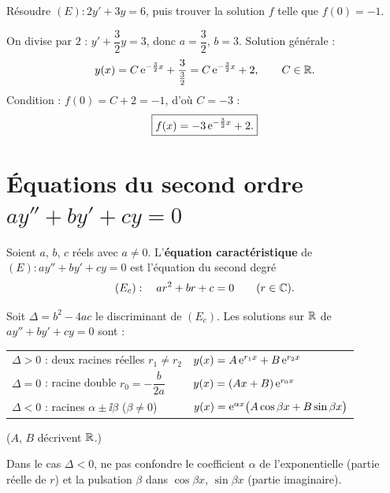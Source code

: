 \exerciceresolu
Résoudre $(E):2y'+3y=6$, puis trouver la solution $f$ telle que $f(0)=-1$.

\solution

On divise par $2$ : $y'+\dfrac32 y=3$, donc $a=\dfrac32$, $b=3$.
Solution générale :
\[
y(x)=C\,\mathrm{e}^{-\frac32 x}+\frac{3}{\frac32}=C\,\mathrm{e}^{-\frac32 x}+2,\qquad C\in\mathbb{R}.
\]
Condition : $f(0)=C+2=-1$, d'où $C=-3$ :
\[
\boxed{f(x)=-3\,\mathrm{e}^{-\frac32 x}+2.}
\]


\section{Équations du second ordre \texorpdfstring{$ay''+by'+cy=0$}{ay''+by'+cy=0}}

\begin{definition}
	Soient $a$, $b$, $c$ réels avec $a\neq 0$. L'\textbf{équation
	caractéristique} de $(E):ay''+by'+cy=0$ est l'équation du second degré
	\[
	(E_c):\quad a r^{2}+b r+c=0\qquad (r\in\mathbb{C}).
	\]
\end{definition}

\begin{theoreme}
	Soit $\Delta=b^{2}-4ac$ le discriminant de $(E_c)$. Les solutions sur $\mathbb{R}$
	de $ay''+by'+cy=0$ sont :
	\begin{center}
	\renewcommand{\arraystretch}{2.0}
	\begin{tabular}{>{\raggedright\arraybackslash}p{3.4cm}
	                >{\raggedright\arraybackslash}p{5.0cm}}
	\hline
	$\Delta>0$ : deux racines réelles $r_1\neq r_2$
	& $y(x)=A\,\mathrm{e}^{r_1 x}+B\,\mathrm{e}^{r_2 x}$ \\
	$\Delta=0$ : racine double $r_0=-\dfrac{b}{2a}$
	& $y(x)=(Ax+B)\,\mathrm{e}^{r_0 x}$ \\
	$\Delta<0$ : racines $\alpha\pm\ii\beta$ ($\beta\neq 0$)
	& $y(x)=\mathrm{e}^{\alpha x}\bigl(A\cos\beta x+B\sin\beta x\bigr)$ \\
	\hline
	\end{tabular}
	\end{center}
	($A$, $B$ décrivent $\mathbb{R}$.)
\end{theoreme}

\begin{attention}
	Dans le cas $\Delta<0$, ne pas confondre le coefficient $\alpha$ de
	l'exponentielle (partie réelle de $r$) et la pulsation $\beta$ dans
	$\cos\beta x$, $\sin\beta x$ (partie imaginaire).
\end{attention}

